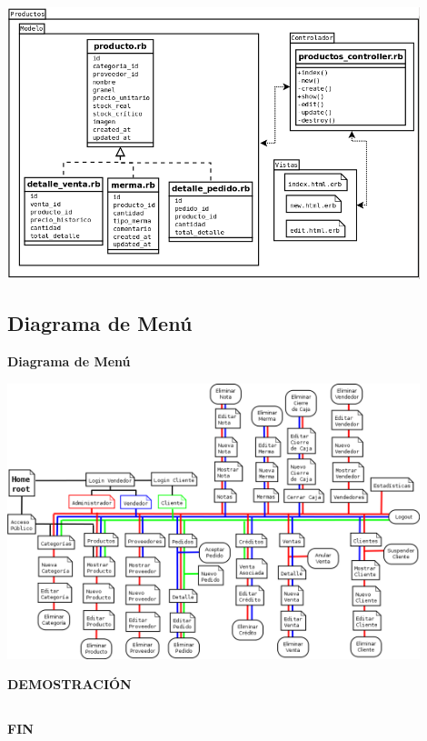 \documentclass{beamer}
\begin{document}
\begin{frame}
\begin{center}
\includegraphics[width=0.9\textwidth]{images/diagramas/mvc_productos.png}
\end{center}
\end{frame}

\subsection{Diagrama de Menú}

\begin{frame}
\begin{center}
\textbf{\huge{Diagrama de Menú}}
\end{center}
\end{frame}

\begin{frame}
\begin{center}
\includegraphics[width=0.9\textwidth]{images/diagramas/diag_menu.png}
\end{center}
\end{frame}

\begin{frame}
\begin{center}
\textbf{\huge{DEMOSTRACIÓN}}
\end{center}
\end{frame}

\subsection{}
\begin{frame}
\begin{center}
\huge{\textbf{FIN}}
\end{center}
\end{frame}
\end{document}
